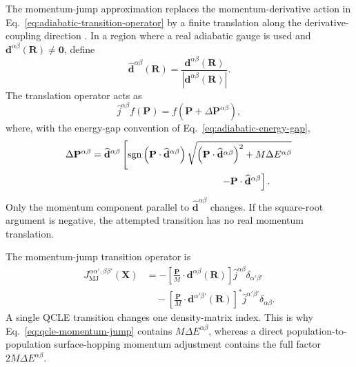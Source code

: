 \documentclass[
  11pt,
  letterpaper,
  onehalfspacing,
  normalmargins,
  equalmargins,
  oneside
]{ut-thesis}
\begin{document}
The momentum-jump approximation replaces the momentum-derivative action in
Eq.~\eqref{eq:adiabatic-transition-operator} by a finite translation along
the derivative-coupling direction
\cite{NielsenKapralCiccotti2000,Kapral2016SurfaceHopping}. In a region where a
real adiabatic gauge is used and
\(\mathbf d^{\alpha\beta}(\mathbf R)\neq\mathbf0\), define
\begin{equation}
\widehat{\mathbf d}^{\alpha\beta}(\mathbf R)
=
\frac{
\mathbf d^{\alpha\beta}(\mathbf R)
}{
|\mathbf d^{\alpha\beta}(\mathbf R)|
}.
\label{eq:nac-unit-vector}
\end{equation}
The translation operator acts as
\begin{equation}
\hat j^{\alpha\beta}f(\mathbf P)
=
f\left(
\mathbf P+\Delta\mathbf P^{\alpha\beta}
\right),
\label{eq:momentum-jump-action}
\end{equation}
where, with the energy-gap convention of
Eq.~\eqref{eq:adiabatic-energy-gap},
\begin{align}
\Delta\mathbf P^{\alpha\beta}
&=
\widehat{\mathbf d}^{\alpha\beta}
\left[
\operatorname{sgn}\left(
\mathbf P\cdot\widehat{\mathbf d}^{\alpha\beta}
\right)
\sqrt{
\left(
\mathbf P\cdot\widehat{\mathbf d}^{\alpha\beta}
\right)^2
+
M\Delta E^{\alpha\beta}
}
\right.
\nonumber\\
&\hspace{4.7cm}
\left.
-
\mathbf P\cdot\widehat{\mathbf d}^{\alpha\beta}
\right].
\label{eq:qcle-momentum-jump}
\end{align}
Only the momentum component parallel to
\(\widehat{\mathbf d}^{\alpha\beta}\) changes. If the square-root argument
is negative, the attempted transition has no real momentum translation.

The momentum-jump transition operator is
\begin{align}
J_{\mathrm{MJ}}^{\alpha\alpha',\beta\beta'}(\mathbf X)
&=
-
\left[
\frac{\mathbf P}{M}\cdot
\mathbf d^{\alpha\beta}(\mathbf R)
\right]
\hat j^{\alpha\beta}
\delta_{\alpha'\beta'}
\nonumber\\
&\quad
-
\left[
\frac{\mathbf P}{M}\cdot
\mathbf d^{\alpha'\beta'}(\mathbf R)
\right]^\ast
\hat j^{\alpha'\beta'}
\delta_{\alpha\beta}.
\label{eq:momentum-jump-transition-operator}
\end{align}
A single QCLE transition changes one density-matrix index. This is why
Eq.~\eqref{eq:qcle-momentum-jump} contains
\(M\Delta E^{\alpha\beta}\), whereas a direct population-to-population
surface-hopping momentum adjustment contains the full factor
\(2M\Delta E^{\alpha\beta}\).
\end{document}
